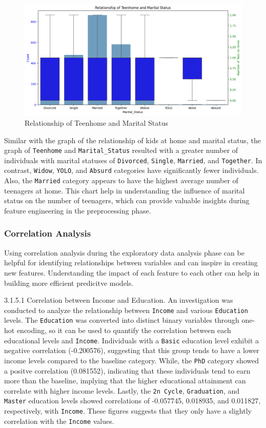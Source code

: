 \begin{figure}[H]
    \centering
    \includegraphics[width=\linewidth]{figures/teenhome_maritalstatus.png}
    \caption{Relationship of Teenhome and Marital Status}
    \label{fig:income hist}
\end{figure}

Similar with the graph of the relationship of kids at home and marital status, the graph of \texttt{Teenhome} and \texttt{Marital_Status} resulted with a greater number of individuals with marital statuses of \texttt{Divorced}, \texttt{Single}, \texttt{Married}, and \texttt{Together}. In contrast, \texttt{Widow}, \texttt{YOLO}, and \texttt{Absurd} categories have significantly fewer individuals. Also, the \texttt{Married} category appears to have the highest average number of teenagers at home. This chart help in understanding the influence of marital status on the number of teenagers, which can provide valuable insights during feature engineering in the preprocessing phase.

\subsubsection{Correlation Analysis}

Using correlation analysis during the exploratory data analysis phase can be helpful for identifying relationships between variables and can inspire in creating new features. Understanding the impact of each feature to each other can help in building more efficient predicitve models.

    3.1.5.1 Correlation between Income and Education. An investigation was conducted to analyze the relationship between \texttt{Income} and various \texttt{Education} levels. The \texttt{Education} was converted into distinct binary variables through one-hot encoding, so it can be used to quantify the correlation between each educational levels and \texttt{Income}. Individuals with a \texttt{Basic} education level exhibit a negative correlation (-0.200576), suggesting that this group tends to have a lower income levels compared to the baseline category. While, the \texttt{PhD} category showed a positve correlation (0.081552), indicating that these individuals tend to earn more than the baseline, implying that the higher educational attainment can correlate with higher income levels. Lastly, the \texttt{2n Cycle}, \texttt{Graduation}, and \texttt{Master} education levels showed correlations of -0.057745, 0.018935, and 0.011827, respectively, with \texttt{Income}. These figures suggests that they only have a slightly correlation with the \texttt{Income} values.

